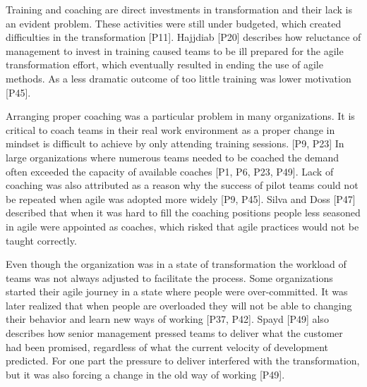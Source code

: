 
Training and coaching are direct investments in transformation and their lack is
an evident problem. These activities were still under budgeted, which
created difficulties in the transformation [P11].
Hajjdiab [P20] describes how reluctance of management to invest in training
caused teams to be ill prepared for the agile transformation effort, which
eventually resulted in ending the use of agile methods. As a less dramatic
outcome of too little training was lower motivation [P45].

Arranging proper coaching was a particular problem in many organizations. It is
critical to coach teams in their real work environment as a proper change in
mindset is difficult to achieve by only attending training sessions. [P9, P23]
In large
organizations where numerous teams needed to be coached the demand often
exceeded the capacity of available coaches [P1, P6, P23, P49]. Lack of coaching
was also attributed as a reason why the success of pilot teams could not be
repeated when agile was adopted more widely [P9, P45].
Silva and Doss [P47] described that when it was hard to fill the coaching
positions people less seasoned in agile were appointed as coaches, which risked
that agile practices would not be taught correctly.




Even though the organization was in a state of transformation the workload of
teams was not always adjusted to facilitate the process.
Some organizations started their agile journey in a state where people were
over-committed. It was later realized that when people are overloaded they will
not be able to changing their behavior and learn new ways of working [P37, P42].
Spayd [P49] also describes how senior management pressed teams to deliver what
the customer had been promised, regardless of what the current velocity of
development predicted. For one part the pressure to deliver interfered with the
transformation, but it was also forcing a change in the old way of working
[P49].

